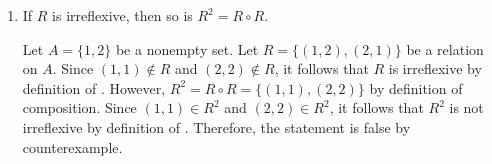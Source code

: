 \begin{enumerate}
\begin{enumerate}
\begin{subprove}
\begin{itemize}
          Therefore, $(a,a) \in R$. 
          Since for all $a \in A$, $(a,a) \in R$, it follows that $R$ is reflexive by definition.
        \end{itemize}
        Therefore, $R$ is reflexive if and only if $\sNOT{R}$ is irreflexive.
      \end{subprove}
    \item If $R$ is irreflexive, then so is $R^2=R \circ R$.
      \begin{subdisprove}
        Let $A = \{1,2\}$ be a nonempty set. Let $R = \{(1,2),(2,1)\}$ be a relation on $A$. 
        Since $(1,1) \notin R$ and $(2,2) \notin R$, it follows that $R$ is irreflexive by definition of . 
        However, $R^2 = R \circ R = \{(1,1),(2,2)\}$ by definition of composition. 
        Since $(1,1) \in R^2$ and $(2,2) \in R^2$, it follows that $R^2$ is not irreflexive by definition of . 
        Therefore, the statement is false by counterexample.
      \end{subdisprove}
  \end{enumerate}


\end{enumerate}
